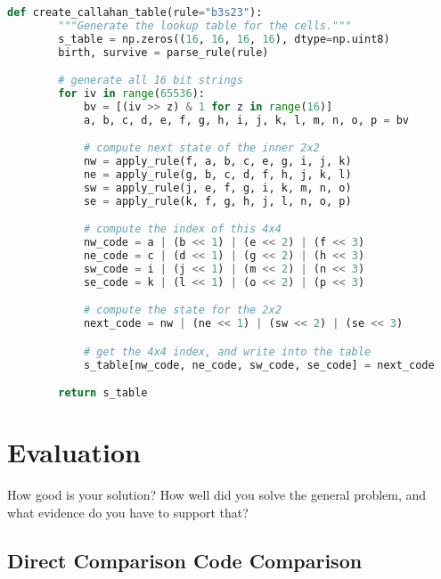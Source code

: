 \documentclass{l4proj}
\begin{document}
\begin{lstlisting}[language=python, float, caption={The algorithm for packing the $3\times 3$ outer-totalistic binary CA successor rule into a 
    $16\times 16\times 16\times 16$ 4 bit lookup table, running an equivalent, notionally 16-state $2\times 2$ CA.}, label=lst:callahan]
    def create_callahan_table(rule="b3s23"):
        """Generate the lookup table for the cells."""        
        s_table = np.zeros((16, 16, 16, 16), dtype=np.uint8)
        birth, survive = parse_rule(rule)

        # generate all 16 bit strings
        for iv in range(65536):
            bv = [(iv >> z) & 1 for z in range(16)]
            a, b, c, d, e, f, g, h, i, j, k, l, m, n, o, p = bv

            # compute next state of the inner 2x2
            nw = apply_rule(f, a, b, c, e, g, i, j, k)
            ne = apply_rule(g, b, c, d, f, h, j, k, l)
            sw = apply_rule(j, e, f, g, i, k, m, n, o)
            se = apply_rule(k, f, g, h, j, l, n, o, p)

            # compute the index of this 4x4
            nw_code = a | (b << 1) | (e << 2) | (f << 3)
            ne_code = c | (d << 1) | (g << 2) | (h << 3)
            sw_code = i | (j << 1) | (m << 2) | (n << 3)
            se_code = k | (l << 1) | (o << 2) | (p << 3)

            # compute the state for the 2x2
            next_code = nw | (ne << 1) | (sw << 2) | (se << 3)

            # get the 4x4 index, and write into the table
            s_table[nw_code, ne_code, sw_code, se_code] = next_code

        return s_table

\end{lstlisting}

\chapter{Evaluation} 
How good is your solution? How well did you solve the general problem, and what evidence do you have to support that?

\section{Direct Comparison Code Comparison}
\end{document}

